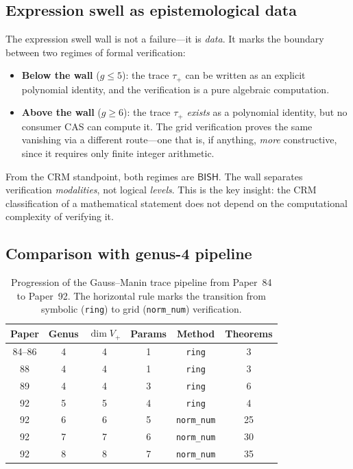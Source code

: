 \documentclass[11pt]{article}
\theoremstyle{plain}
\theoremstyle{definition}
\theoremstyle{remark}
\newcommand{\BISH}{\mathsf{BISH}}
\begin{document}
\subsection{Expression swell as epistemological data}

The expression swell wall is not a failure---it is \emph{data}.  It marks
the boundary between two regimes of formal verification:
\begin{itemize}[nosep]
  \item \textbf{Below the wall} ($g \leq 5$): the trace $\tau_+$ can be
    written as an explicit polynomial identity, and the verification is
    a pure algebraic computation.
  \item \textbf{Above the wall} ($g \geq 6$): the trace $\tau_+$ \emph{exists}
    as a polynomial identity, but no consumer CAS can compute it.
    The grid verification proves the same vanishing via a different route---one
    that is, if anything, \emph{more} constructive, since it requires only
    finite integer arithmetic.
\end{itemize}
From the CRM standpoint, both regimes are $\BISH$.  The wall separates
verification \emph{modalities}, not logical \emph{levels}.  This is the
key insight: the CRM classification of a mathematical statement does not
depend on the computational complexity of verifying it.

\subsection{Comparison with genus-4 pipeline}

\begin{table}[ht]
\centering
\caption{Progression of the Gauss--Manin trace pipeline from Paper~84
  to Paper~92.  The horizontal rule marks the transition from symbolic
  (\texttt{ring}) to grid (\texttt{norm\_num}) verification.}
\label{tab:progression}
\begin{tabular}{cccccc}
\toprule
\textbf{Paper} & \textbf{Genus} & $\dim V_+$ & \textbf{Params} & \textbf{Method} & \textbf{Theorems} \\
\midrule
84--86 & 4 & 4 & 1 & \texttt{ring} & 3 \\
88     & 4 & 4 & 1 & \texttt{ring} & 3 \\
89     & 4 & 4 & 3 & \texttt{ring} & 6 \\
92     & 5 & 5 & 4 & \texttt{ring} & 4 \\
\midrule[\heavyrulewidth]
92     & 6 & 6 & 5 & \texttt{norm\_num} & 25 \\
92     & 7 & 7 & 6 & \texttt{norm\_num} & 30 \\
92     & 8 & 8 & 7 & \texttt{norm\_num} & 35 \\
\bottomrule
\end{tabular}
\end{table}
\end{document}
